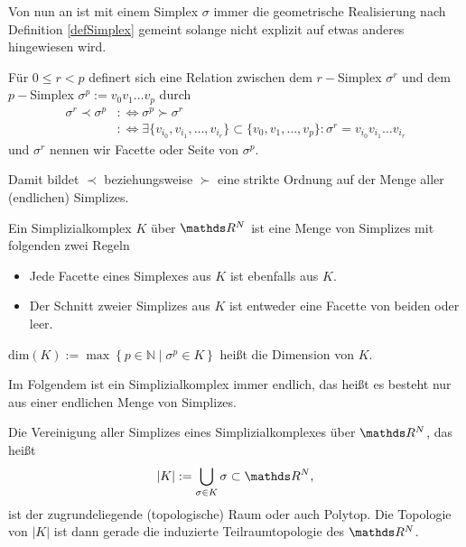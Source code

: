     Von nun an ist mit einem Simplex \( \sigma \) immer die geometrische Realisierung nach Definition \ref{defSimplex} gemeint solange nicht explizit auf
    etwas anderes hingewiesen wird.

    \begin{definition}
      Für \( 0 \le r < p \) definert sich eine Relation zwischen dem \( r- \)Simplex \(\sigma^{r}\) und dem \( p- \)Simplex \( \sigma^{p}:= v_{0} v_{1} \ldots v_{p} \) durch
      \begin{align}
        \sigma^{r} \prec \sigma^{p} &:\Leftrightarrow \sigma^{p} \succ \sigma^{r} \\
                                    &:\Leftrightarrow \exists \{ v_{i_{0}}, v_{i_{1}}, \ldots, v_{i_{r}} \} \subset \{ v_{0}, v_{1}, \ldots, v_{p}\} : \sigma^{r} = v_{i_{0}} v_{i_{1}} \ldots v_{i_{r}}
      \end{align}
      und \( \sigma^{r} \) nennen wir Facette oder Seite von \( \sigma^{p} \).
    \end{definition}
    
    Damit bildet \( \prec \) beziehungsweise \( \succ \) eine strikte Ordnung auf der Menge aller (endlichen) Simplizes.
    
    \begin{definition}
      Ein Simplizialkomplex \( K \) über \( \R^{N} \) ist eine Menge von Simplizes mit folgenden zwei Regeln
      \begin{itemize}
        \item Jede Facette eines Simplexes aus \( K \) ist ebenfalls aus \( K \).
        \item Der Schnitt zweier Simplizes aus \( K \) ist entweder eine Facette von beiden oder leer.
      \end{itemize}
      
      \( \text{dim}(K) := \max\left\{ p \in \mathds{N} \middle| \sigma^{p} \in K \right\} \)
      heißt die Dimension von \( K \).
    \end{definition}

    Im Folgendem ist ein Simplizialkomplex immer endlich, das heißt es besteht nur aus einer endlichen Menge von Simplizes.

    \begin{definition}
      Die Vereinigung aller Simplizes eines Simplizialkomplexes über \( \R^{N} \), das heißt
      \begin{align}
        |K| := \bigcup_{\sigma \in K} \sigma \subset \R^{N} \text{,}
      \end{align}
      ist der zugrundeliegende (topologische) Raum oder auch Polytop.
      Die Topologie von \( |K| \) ist dann gerade die induzierte Teilraumtopologie des \( \R^{N} \).
    \end{definition}
    
